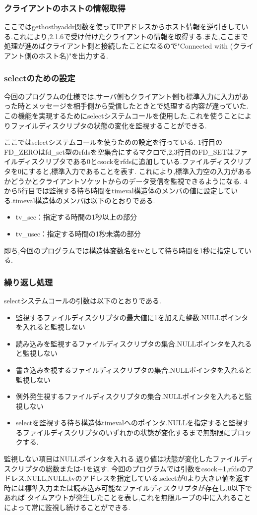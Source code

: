\documentclass[dvipdfmx]{jarticle}
\begin{document}
\subsubsection{クライアントのホストの情報取得}
ここではgethostbyaddr関数を使ってIPアドレスからホスト情報を逆引きしている.これにより,2.1.6で受け付けたクライアントの情報を取得する.また,ここまで処理が進めばクライアント側と接続したことになるので"Connected with (クライアント側のホスト名)"を出力する.
\subsubsection{selectのための設定}
今回のプログラムの仕様では,サーバ側もクライアント側も標準入力に入力があった時とメッセージを相手側から受信したときとで処理する内容が違っていた.この機能を実現するためにselectシステムコールを使用した.これを使うことによりファイルディスクリプタの状態の変化を監視することができる.

ここではselectシステムコールを使うための設定を行っている.
1行目のFD\_ZEROはfd\_set型のrfdsを空集合にするマクロで,2,3行目のFD\_SETはファイルディスクリプタである0とcsockをrfdsに追加している.ファイルディスクリプタを0にすると,標準入力であることを表す.\cite{16}
これにより,標準入力空の入力があるかどうかとクライアントソケットからのデータ受信を監視できるようになる.
4から5行目では監視する待ち時間をtimeval構造体のメンバの値に設定している.timeval構造体のメンバは以下のとおりである.
\begin{itemize}
    \item tv\_sec：指定する時間の1秒以上の部分
    \item tv\_usec：指定する時間の1秒未満の部分
\end{itemize}
即ち,今回のプログラムでは構造体変数名をtvとして待ち時間を1秒に指定している.
\subsubsection{繰り返し処理}
selectシステムコールの引数は以下のとおりである.\cite{1}
\begin{itemize}
    \item 監視するファイルディスクリプタの最大値に1を加えた整数.NULLポインタを入れると監視しない
    \item 読み込みを監視するファイルディスクリプタの集合.NULLポインタを入れると監視しない
    \item 書き込みを視するファイルディスクリプタの集合.NULLポインタを入れると監視しない
    \item 例外発生視するファイルディスクリプタの集合.NULLポインタを入れると監視しない
    \item selectを監視する待ち構造体timevalへのポインタ.NULLを指定すると監視するファイルディスクリプタのいずれかの状態が変化するまで無期限にブロックする.
\end{itemize}
監視しない項目はNULLポインタを入れる.返り値は状態が変化したファイルディスクリプタの総数または-1を返す.
今回のプログラムでは引数をcsock+1,rfdsのアドレス,NULL,NULL,tvのアドレスを指定している.selectが0より大きい値を返す時には標準入力または読み込み可能なファイルディスクリプタが存在し,0以下であれば
タイムアウトが発生したことを表し,これを無限ループの中に入れることによって常に監視し続けることができる.
\end{document}
